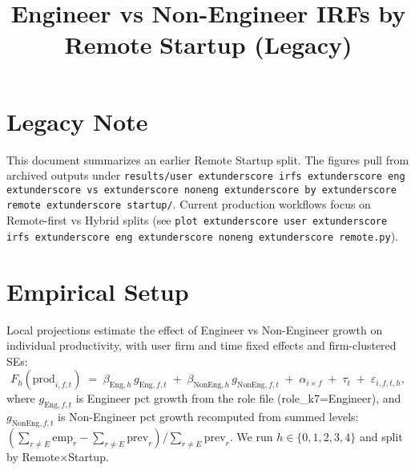 \documentclass[11pt]{article}
\title{Engineer vs Non-Engineer IRFs by Remote\,\texttimes\,Startup (Legacy)}
\date{\vspace{-1.5em}}
\begin{document}
\maketitle

\section*{Legacy Note}
This document summarizes an earlier Remote\,\texttimes\,Startup split. The
figures pull from archived outputs under
\texttt{results/user	extunderscore irfs	extunderscore eng	extunderscore vs	extunderscore noneng	extunderscore by	extunderscore remote	extunderscore startup/}.
Current production workflows focus on Remote-first vs Hybrid splits (see
\texttt{plot	extunderscore user	extunderscore irfs	extunderscore eng	extunderscore noneng	extunderscore remote.py}).

\section*{Empirical Setup}
Local projections estimate the effect of Engineer vs Non-Engineer growth on individual productivity, with user\,\texttimes\,firm and time fixed effects and firm-clustered SEs:
\begin{equation*}
  F_h(\text{prod}_{i,f,t}) \;=\; \beta_{\text{Eng},h}\, g_{\text{Eng},f,t}\; +\; \beta_{\text{NonEng},h}\, g_{\text{NonEng},f,t}\; +\; \alpha_{i\times f}\; +\; \tau_t\; +\; \varepsilon_{i,f,t,h},
\end{equation*}
where $g_{\text{Eng},f,t}$ is Engineer pct growth from the role file (role\_k7=Engineer), and $g_{\text{NonEng},f,t}$ is Non-Engineer pct growth recomputed from summed levels: $(\sum_{r\neq E}\text{emp}_{r} - \sum_{r\neq E}\text{prev}_{r})/\sum_{r\neq E}\text{prev}_{r}$. We run $h\in\{0,1,2,3,4\}$ and split by Remote$\times$Startup.
\end{document}
